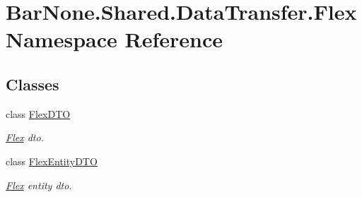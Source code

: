 \hypertarget{namespace_bar_none_1_1_shared_1_1_data_transfer_1_1_flex}{}\section{Bar\+None.\+Shared.\+Data\+Transfer.\+Flex Namespace Reference}
\label{namespace_bar_none_1_1_shared_1_1_data_transfer_1_1_flex}
\subsection*{Classes}
\begin{DoxyCompactItemize}
\item 
class \mbox{\hyperlink{class_bar_none_1_1_shared_1_1_data_transfer_1_1_flex_1_1_flex_d_t_o}{Flex\+D\+TO}}
\begin{DoxyCompactList}\small\item\em \mbox{\hyperlink{namespace_bar_none_1_1_shared_1_1_data_transfer_1_1_flex}{Flex}} dto. \end{DoxyCompactList}\item 
class \mbox{\hyperlink{class_bar_none_1_1_shared_1_1_data_transfer_1_1_flex_1_1_flex_entity_d_t_o}{Flex\+Entity\+D\+TO}}
\begin{DoxyCompactList}\small\item\em \mbox{\hyperlink{namespace_bar_none_1_1_shared_1_1_data_transfer_1_1_flex}{Flex}} entity dto. \end{DoxyCompactList}\end{DoxyCompactItemize}
